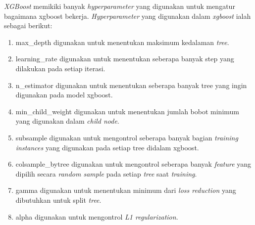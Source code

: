 \textit{XGBoost} memikiki banyak \textit{hyperparameter} yang digunakan untuk mengatur bagaimana xgboost bekerja. \textit{Hyperparameter} yang digunakan dalam \textit{xgboost} ialah sebagai berikut\cite{xgboost_parameter_documentation}:
\begin{enumerate}[noitemsep]
    \item max\_depth digunakan untuk menentukan maksimum kedalaman \textit{tree}.
    \item learning\_rate digunakan untuk menentukan seberapa banyak step yang dilakukan pada setiap iterasi.
    \item n\_estimator digunakan untuk menentukan seberapa banyak tree yang ingin digunakan pada model xgboost.
    \item min\_child\_weight digunakan untuk menentukan jumlah bobot minimum yang digunakan dalam \textit{child node}.
    \item subsample digunakan untuk mengontrol seberapa banyak bagian \textit{training instances} yang digunakan pada setiap tree didalam xgboost.
    \item colsample\_bytree digunakan untuk mengontrol seberapa banyak \textit{feature} yang dipilih secara \textit{random sample} pada setiap \textit{tree} saat \textit{training}.
    \item gamma digunakan untuk menentukan minimum dari \textit{loss reduction} yang dibutuhkan untuk split \textit{tree}.
    \item alpha digunakan untuk mengontrol \textit{L1 regularization}.
\end{enumerate}

